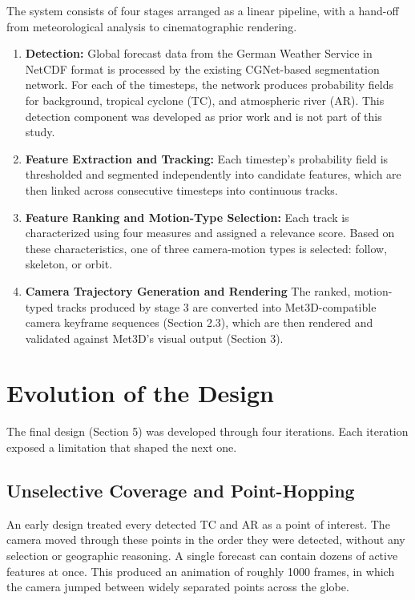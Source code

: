 \documentclass[journal abbreviation, manuscript]{copernicus}
\begin{document}
The system consists of four stages arranged as a linear pipeline, with a hand-off from meteorological analysis to cinematographic rendering.

\begin{enumerate}
    \item \textbf{Detection:}
   Global forecast data from the German Weather Service in NetCDF format is processed by the existing CGNet-based segmentation network. For each of the timesteps, the network produces probability fields for background, tropical cyclone (TC), and atmospheric river (AR). This detection component was developed as prior work and is not part of this study.

    \item \textbf{Feature Extraction and Tracking:}
    Each timestep's probability field is thresholded and segmented independently into candidate features, which are then linked across consecutive timesteps into continuous tracks.

    \item \textbf{Feature Ranking and Motion-Type Selection:}
   Each track is characterized using four measures and assigned a relevance score. Based on these characteristics, one of three camera-motion types is selected: follow, skeleton, or orbit.

    \item \textbf{Camera Trajectory Generation and Rendering}
    The ranked, motion-typed tracks produced by stage 3 are converted into Met3D-compatible camera keyframe sequences (Section 2.3), which are then rendered and validated against Met3D's visual output (Section 3).
    
\end{enumerate}

\section{Evolution of the Design}

The final design (Section 5) was developed through four iterations. Each
iteration exposed a limitation that shaped the next one.

\subsection{Unselective Coverage and Point-Hopping}

An early design treated every detected TC and AR as a point of interest.
The camera moved through these points in the order they were detected,
without any selection or geographic reasoning. A single forecast can
contain dozens of active features at once. This produced an animation of
roughly 1000 frames, in which the camera jumped between widely separated
points across the globe.
\end{document}
